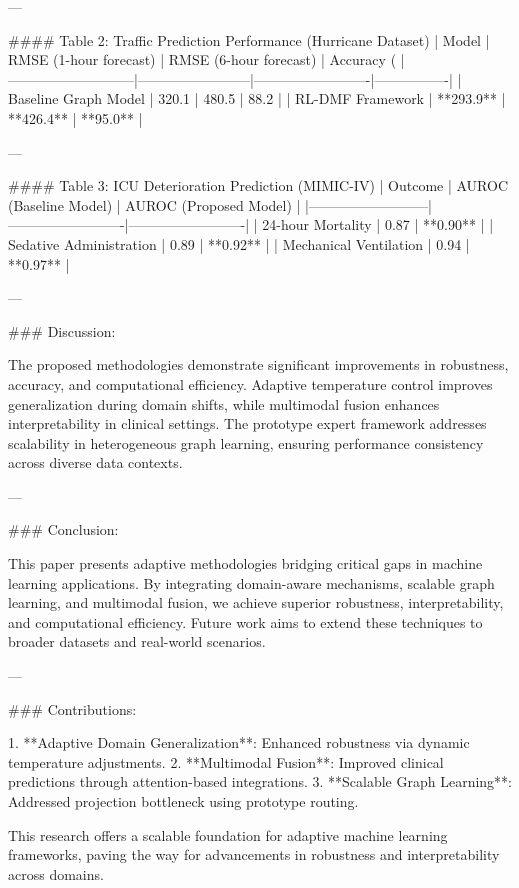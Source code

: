 ---

#### Table 2: Traffic Prediction Performance (Hurricane Dataset)
| Model                     | RMSE (1-hour forecast) | RMSE (6-hour forecast) | Accuracy (%
|---------------------------|------------------------|-------------------------|----------------|
| Baseline Graph Model      | 320.1                 | 480.5                  | 88.2           |
| RL-DMF Framework          | **293.9**             | **426.4**              | **95.0**       |

---

#### Table 3: ICU Deterioration Prediction (MIMIC-IV)
| Outcome                  | AUROC (Baseline Model) | AUROC (Proposed Model) |
|--------------------------|-------------------------|-------------------------|
| 24-hour Mortality         | 0.87                   | **0.90**               |
| Sedative Administration   | 0.89                   | **0.92**               |
| Mechanical Ventilation    | 0.94                   | **0.97**               |

---

### Discussion:

The proposed methodologies demonstrate significant improvements in robustness, accuracy, and computational efficiency. Adaptive temperature control improves generalization during domain shifts, while multimodal fusion enhances interpretability in clinical settings. The prototype expert framework addresses scalability in heterogeneous graph learning, ensuring performance consistency across diverse data contexts.

---

### Conclusion:

This paper presents adaptive methodologies bridging critical gaps in machine learning applications. By integrating domain-aware mechanisms, scalable graph learning, and multimodal fusion, we achieve superior robustness, interpretability, and computational efficiency. Future work aims to extend these techniques to broader datasets and real-world scenarios.

---

### Contributions:

1. **Adaptive Domain Generalization**: Enhanced robustness via dynamic temperature adjustments.
2. **Multimodal Fusion**: Improved clinical predictions through attention-based integrations.
3. **Scalable Graph Learning**: Addressed projection bottleneck using prototype routing.

This research offers a scalable foundation for adaptive machine learning frameworks, paving the way for advancements in robustness and interpretability across domains.